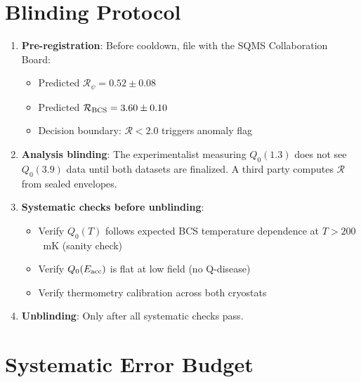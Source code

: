 \documentclass[11pt]{article}
\theoremstyle{definition}
\theoremstyle{remark}
\begin{document}
\section{Blinding Protocol}
\label{sec:blinding}

\begin{enumerate}
\item \textbf{Pre-registration}: Before cooldown, file with the
  SQMS Collaboration Board:
  \begin{itemize}[nosep]
  \item Predicted $\mathcal{R}_\psi = 0.52 \pm 0.08$
  \item Predicted $\mathcal{R}_{\rm BCS} = 3.60 \pm 0.10$
  \item Decision boundary: $\mathcal{R} < 2.0$ triggers anomaly flag
  \end{itemize}

\item \textbf{Analysis blinding}: The experimentalist measuring
  $Q_0(1.3)$ does not see $Q_0(3.9)$ data until both datasets are
  finalized. A third party computes $\mathcal{R}$ from sealed envelopes.

\item \textbf{Systematic checks before unblinding}:
  \begin{itemize}[nosep]
  \item Verify $Q_0(T)$ follows expected BCS temperature dependence
    at $T > 200$~mK (sanity check)
  \item Verify $Q_0(E_{\rm acc})$ is flat at low field (no Q-disease)
  \item Verify thermometry calibration across both cryostats
  \end{itemize}

\item \textbf{Unblinding}: Only after all systematic checks pass.
\end{enumerate}


\section{Systematic Error Budget}
\end{document}
